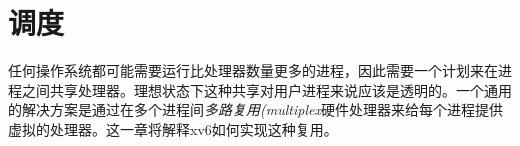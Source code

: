 \chapter{调度}

任何操作系统都可能需要运行比处理器数量更多的进程，因此需要一个计划来在进程之间共享处理器。理想状态下这种共享对用户进程来说应该是透明的。一个通用的解决方案是通过在多个进程间\emph{多路复用(multiplex}硬件处理器来给每个进程提供虚拟的处理器。这一章将解释xv6如何实现这种复用。
